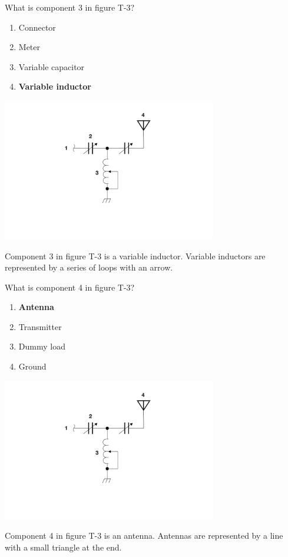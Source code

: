 \begin{tcolorbox}[
    colback=gray!10!white,
    colframe=black!75!black,
    title={T6C10},
    sidebyside,
    sidebyside align=top,
    lefthand width=0.45\textwidth
]
What is component 3 in figure T-3?
\begin{enumerate}[label=\Alph*),noitemsep]
    \item Connector
    \item Meter
    \item Variable capacitor
    \item \textbf{Variable inductor}
\end{enumerate}
\tcblower
\includegraphics[width=0.7\textwidth]{images/t3.png}
\end{tcolorbox}
Component 3 in figure T-3 is a variable inductor. Variable inductors are represented by a series of loops with an arrow.

\begin{tcolorbox}[
    colback=gray!10!white,
    colframe=black!75!black,
    title={T6C11},
    sidebyside,
    sidebyside align=top,
    lefthand width=0.45\textwidth
]
What is component 4 in figure T-3?
\begin{enumerate}[label=\Alph*),noitemsep]
    \item \textbf{Antenna}
    \item Transmitter
    \item Dummy load
    \item Ground
\end{enumerate}
\tcblower
\includegraphics[width=0.7\textwidth]{images/t3.png}
\end{tcolorbox}
Component 4 in figure T-3 is an antenna. Antennas are represented by a line with a small triangle at the end.

